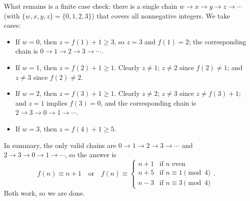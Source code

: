 What remains is a finite case check: there is a single chain $w\to x\to y\to z\to\cdots$ (with $\{w,x,y,z\}=\{0,1,2,3\}$) that covers all nonnegative integers. We take cases:
\begin{itemize}
    \item If $w=0$, then $z=f(1)+1\ge3$, so $z=3$ and $f(1)=2$; the corresponding chain is $0\to1\to2\to3\to\cdots$.
    \item If $w=1$, then $z=f(2)+1\ge1$. Clearly $z\ne1$; $z\ne2$ since $f(2)\ne1$; and $z\ne3$ since $f(2)\ne2$.
    \item If $w=2$, then $z=f(3)+1\ge1$. Clearly $z\ne2$; $z\ne3$ since $z\ne f(3)+1$; and $z=1$ implies $f(3)=0$, and the corresponding chain is $2\to3\to0\to1\to\cdots$.
    \item If $w=3$, then $z=f(4)+1\ge5$.
\end{itemize}
In summary, the only valid chains are $0\to1\to2\to3\to\cdots$ and $2\to3\to0\to1\to\cdots$, so the answer is
\[
    \boxed{f(n)\equiv n+1}\quad\text{or}\quad\boxed{f(n)\equiv
        \begin{cases}
            n+1&\text{if $n$ even}\\
            n+5&\text{if $n\equiv1\pmod4$}\\
            n-3&\text{if $n\equiv3\pmod4$}
    \end{cases} }.
\]
Both work, so we are done.
